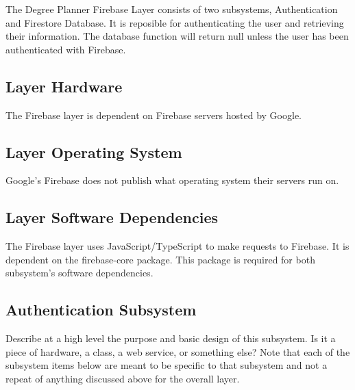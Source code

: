 The Degree Planner Firebase Layer consists of two subsystems, Authentication and Firestore Database. It is reposible for authenticating the user and retrieving their information. The database function will return null unless the user has been authenticated with Firebase.

\subsection{Layer Hardware}
The Firebase layer is dependent on Firebase servers hosted by Google.

\subsection{Layer Operating System}
Google's Firebase does not publish what operating system their servers run on.

\subsection{Layer Software Dependencies}
The Firebase layer uses JavaScript/TypeScript to make requests to Firebase. It is dependent on the firebase-core package. This package is required for both subsystem's software dependencies.

\subsection{Authentication Subsystem}
Describe at a high level the purpose and basic design of this subsystem. Is it a piece of hardware, a class, a web service, or something else? Note that each of the subsystem items below are meant to be specific to that subsystem and not a repeat of anything discussed above for the overall layer.

